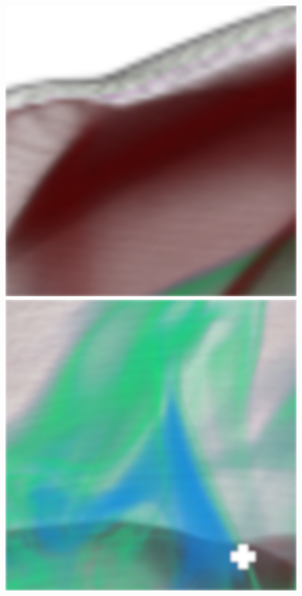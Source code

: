 \begin{figure}[]
	\centering
	\begin{minipage}[t]{0.3\textwidth}
		\centering
		\includegraphics[width=1\textwidth]{../../Neue_Messungen/Supernova/cut/mdc/mdc_1.png}
	\end{minipage}
	\hfill
	\begin{minipage}[t]{0.3\textwidth}
		\centering
		\includegraphics[width=1\textwidth]{../../Neue_Messungen/Supernova/cut/mdc/mdc_2.png}

\end{minipage}
\end{figure}
